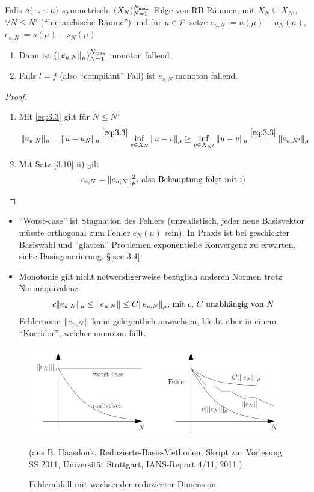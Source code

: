 \begin{kor}
	Falls $a(\,\cdot\,,\,\cdot\,;\mu)$ symmetrisch, $\left(X_N\right)_{N=1}^{N_\text{max}}$ Folge von RB-Räumen, mit $X_N \subseteq X_{N'}$, $\forall N \leq N'$ (``hierarchische Räume'') und für $\mu \in \mathcal{P}$ setze $e_{u,N} := u(\mu)-u_N(\mu)$, $e_{s,N} := s(\mu)-s_N(\mu)$.
	\begin{enumerate}
		\item Dann ist $\left(\|e_{u,N}\|_\mu\right)_{N=1}^{N_\text{max}}$ monoton fallend.
		\item Falls $l=f$ (also ``compliant'' Fall) ist $e_{s,N}$ monoton fallend.
	\end{enumerate}

	\begin{proof} \beginwithlistbew
		\begin{enumerate}
			\item Mit \eqref{eq:3.3} gilt für $N \leq N'$
				\[
					\|e_{u,N}\|_\mu = \|u-u_N\|_\mu \stackrel{\eqref{eq:3.3}}{=} \inf_{v \in X_N} \|u-v\|_\mu \geq \inf_{v \in X_{N'}} \|u-v\|_\mu \stackrel{\eqref{eq:3.3}}{=} \|e_{u,N'}\|_\mu
				\]
			\item Mit Satz \ref{3.10} ii) gilt
				\[
					e_{s,N} = \|e_{u,N}\|_\mu^2 \text{, also Behauptung folgt mit i)}
				\]
		\end{enumerate}
	\end{proof}
\end{kor}

\begin{bem} \beginwithlistbem
	\begin{itemize}
		\item ``Worst-case'' ist Stagnation des Fehlers (unrealistisch, jeder neue Basisvektor müsste orthogonal zum Fehler $e_N(\mu)$ sein).
			In Praxis ist bei geschickter Basiswahl und ``glatten'' Problemen exponentielle Konvergenz zu erwarten, siehe Basisgenerierung, §\ref{sec-3.4}.
		\item Monotonie gilt nicht notwendigerweise bezüglich anderen Normen trotz Normäquivalenz
			\[
				c \|e_{u,N}\|_\mu \leq \|e_{u,N}\| \leq C \|e_{u,N}\|_\mu \text{, mit $c$, $C$ unabhängig von $N$}
			\]
			Fehlernorm $\|e_{u,N}\|$ kann gelegentlich anwachsen, bleibt aber in einem ``Korridor'', welcher monoton fällt.
	\end{itemize}

	\begin{figure}[H]
		\centering\small
		\includegraphics[width = 0.75 \textwidth]{Bilder/FehlerabfallEnergienorm.png}
		\caption{Fehlerabfall mit wachsender reduzierter Dimension.}{(aus B. Haasdonk, Reduzierte-Basis-Methoden, Skript zur Vorlesung SS 2011, Universität Stuttgart, IANS-Report 4/11, 2011.)}
		\label{fig:FehlerabfallEnergienorm}
	\end{figure}
\end{bem}

